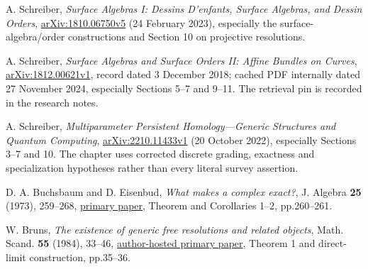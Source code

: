  A. Schreiber,
\emph{Surface Algebras I: Dessins D'enfants, Surface Algebras, and Dessin Orders},
\href{https://arxiv.org/abs/1810.06750v5}{arXiv:1810.06750v5} (24 February 2023),
especially the surface-algebra/order constructions and Section 10 on projective resolutions.

 A. Schreiber,
\emph{Surface Algebras and Surface Orders II: Affine Bundles on Curves},
\href{https://arxiv.org/abs/1812.00621v1}{arXiv:1812.00621v1},
record dated 3 December 2018; cached PDF internally dated 27 November 2024,
especially Sections 5--7 and 9--11. The retrieval pin is recorded in the research notes.

 A. Schreiber,
\emph{Multiparameter Persistent Homology---Generic Structures and Quantum Computing},
\href{https://arxiv.org/abs/2210.11433v1}{arXiv:2210.11433v1} (20 October 2022),
especially Sections 3--7 and 10. The chapter uses corrected discrete grading,
exactness and specialization hypotheses rather than every literal survey assertion.

 D. A. Buchsbaum and D. Eisenbud,
\emph{What makes a complex exact?}, J. Algebra \textbf{25} (1973), 259--268,
\href{https://eisenbud.github.io/papers/pdfs/1973-002.pdf}{primary paper},
Theorem and Corollaries 1--2, pp.260--261.

 W. Bruns,
\emph{The existence of generic free resolutions and related objects},
Math. Scand. \textbf{55} (1984), 33--46,
\href{https://www.home.uni-osnabrueck.de/wbruns/brunsw/pdf-article/GenFreeRes.pdf}{author-hosted primary paper},
Theorem 1 and direct-limit construction, pp.35--36.
